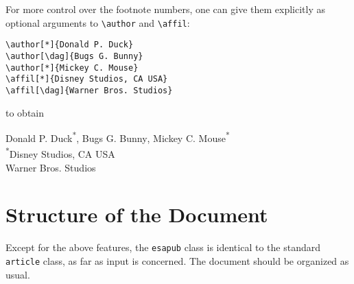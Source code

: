 \documentclass[a4paper,twocolumn]{esapub2005} %
\newcommand{\filename}{esapub}
\begin{document}
For more control over the footnote numbers, one can give them explicitly
as optional arguments to \verb!\author! and \verb!\affil!:
\begin{verbatim}
\author[*]{Donald P. Duck}
\author[\dag]{Bugs G. Bunny}
\author[*]{Mickey C. Mouse}
\affil[*]{Disney Studios, CA USA}
\affil[\dag]{Warner Bros. Studios}
\end{verbatim}
to obtain
\begin{center}
Donald P. Duck\textsuperscript{*},
Bugs G. Bunny\textsuperscript{\dag},
Mickey C. Mouse\textsuperscript{*}\\[0.5ex]
\textsuperscript{*}Disney Studios, CA USA\\
\textsuperscript{\dag}Warner Bros. Studios
\end{center}


\section{Structure of the Document}

Except for the above features, the \texttt{\filename} class is identical to
the standard \texttt{article} class, as far as input is concerned. The
document should be organized as usual.
\end{document}
